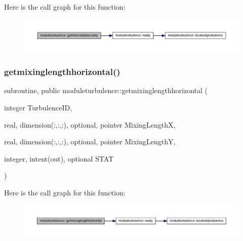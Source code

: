 Here is the call graph for this function\+:\nopagebreak
\begin{figure}[H]
\begin{center}
\leavevmode
\includegraphics[width=350pt]{namespacemoduleturbulence_a37e3796794d913feea94c19ec07b14fb_cgraph}
\end{center}
\end{figure}
\mbox{\label{namespacemoduleturbulence_ad3675f05df244e553dafe1a09eb8f7e1}} 
\subsubsection{\texorpdfstring{getmixinglengthhorizontal()}{getmixinglengthhorizontal()}}
{\footnotesize\ttfamily subroutine, public moduleturbulence\+::getmixinglengthhorizontal (\begin{DoxyParamCaption}\item[{integer}]{Turbulence\+ID,  }\item[{real, dimension(\+:,\+:,\+:), optional, pointer}]{Mixing\+LengthX,  }\item[{real, dimension(\+:,\+:,\+:), optional, pointer}]{Mixing\+LengthY,  }\item[{integer, intent(out), optional}]{S\+T\+AT }\end{DoxyParamCaption})}

Here is the call graph for this function\+:\nopagebreak
\begin{figure}[H]
\begin{center}
\leavevmode
\includegraphics[width=350pt]{namespacemoduleturbulence_ad3675f05df244e553dafe1a09eb8f7e1_cgraph}
\end{center}
\end{figure}
\mbox{\label{namespacemoduleturbulence_a9ca6f654636dff4860b7e20134c59253}} 
